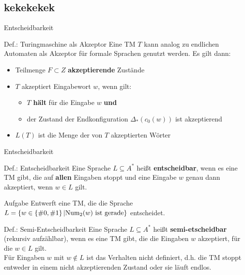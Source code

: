 \subsection{kekekekek}

\begin{frame}{Entscheidbarkeit}
	\begin{block}{Def.: Turingmaschine als Akzeptor}
		Eine TM $T$ kann analog zu endlichen Automaten als Akzeptor für formale Sprachen genutzt werden. Es gilt dann:
		\begin{itemize}
			\item Teilmenge $F \subset Z$ \textbf{akzeptierende} Zustände
			\item $T$ akzeptiert Eingabewort $w$, wenn gilt:
			\begin{itemize}
				\item $T$ \textbf{hält} für die Eingabe $w$ \textbf{und}
				\item der Zustand der Endkonfiguration $\Delta_*(c_0(w))$ ist akzeptierend
			\end{itemize}
			\item $L(T)$ ist die Menge der von $T$ akzeptierten Wörter
		\end{itemize}
	\end{block}
\end{frame}

\begin{frame}{Entscheidbarkeit}
    \begin{block}{Def.: Entscheidbarkeit}
    	Eine Sprache $L \subseteq A^*$ heißt \textbf{entscheidbar}, wenn es eine TM gibt, die auf \textbf{allen} Eingaben stoppt und eine Eingabe $w$ genau dann akzeptiert, wenn $w\in L$ gilt.
    \end{block}

    \begin{exampleblock}{Aufgabe}
		Entwerft eine TM, die die Sprache $L = \left\{ w \in \left\{ \#0,\#1 \right\} | \text{Num}_2(w) \text{ ist gerade} \right\}$ entscheidet.
	\end{exampleblock}
\pause
    \begin{block}{Def.: Semi-Entscheidbarkeit}
    	Eine Sprache $L \subseteq A^*$ heißt \textbf{semi-etscheidbar} (rekursiv aufzählbar), wenn es eine TM gibt, die die Eingaben $w$ akzeptiert, für die $w\in L$ gilt.\\
    	Für Eingaben $w$ mit $w \notin L$ ist das Verhalten nicht definiert, d.h. die TM stoppt entweder in einem nicht akzeptierenden Zustand oder sie läuft endlos.
    \end{block} 
\end{frame}

